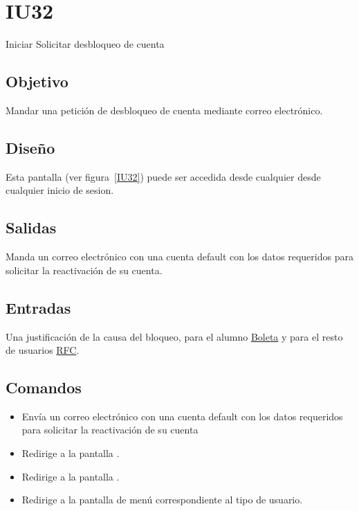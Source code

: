 
\section{IU32} {Iniciar Solicitar desbloqueo de cuenta}

\subsection{Objetivo}
    Mandar una petición de desbloqueo de cuenta mediante correo electrónico.

\subsection{Diseño}
	Esta pantalla  (ver figura~\ref{IU32}) puede ser accedida desde cualquier desde cualquier inicio de sesion.



\subsection{Salidas}

    Manda un correo electrónico con una cuenta default con los datos requeridos para solicitar la reactivación de su cuenta.

\subsection{Entradas}
    Una justificación de la causa del bloqueo, para el alumno \hyperlink{Alumno.Boleta}{Boleta} y para el resto de usuarios \hyperlink{Empleado.RFC}{RFC}.


\subsection{Comandos}
\begin{itemize}

    \item {} Envía un correo electrónico con una cuenta default con los datos requeridos para solicitar la reactivación de su cuenta
    \item {} Redirige a la pantalla .
    \item {} Redirige a la pantalla .
    \item {} Redirige a la pantalla de menú correspondiente al tipo de usuario.
	
\end{itemize}

